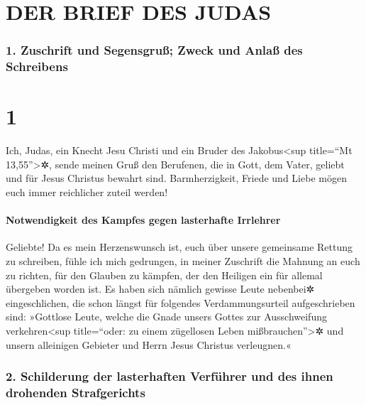 \hypertarget{der-brief-des-judas}{%
\section{DER BRIEF DES JUDAS}\label{der-brief-des-judas}}

\hypertarget{zuschrift-und-segensgruuxdf-zweck-und-anlauxdf-des-schreibens}{%
\subsubsection{1. Zuschrift und Segensgruß; Zweck und Anlaß des
Schreibens}\label{zuschrift-und-segensgruuxdf-zweck-und-anlauxdf-des-schreibens}}

\hypertarget{section}{%
\section{1}\label{section}}

 Ich, Judas, ein Knecht Jesu Christi und ein Bruder des
Jakobus\textless sup title=``Mt 13,55''\textgreater✲, sende meinen Gruß
den Berufenen, die in Gott, dem Vater, geliebt und für Jesus Christus
bewahrt sind.  Barmherzigkeit, Friede und Liebe mögen euch
immer reichlicher zuteil werden!

\hypertarget{notwendigkeit-des-kampfes-gegen-lasterhafte-irrlehrer}{%
\paragraph{Notwendigkeit des Kampfes gegen lasterhafte
Irrlehrer}\label{notwendigkeit-des-kampfes-gegen-lasterhafte-irrlehrer}}

 Geliebte! Da es mein Herzenswunsch ist, euch über unsere
gemeinsame Rettung zu schreiben, fühle ich mich gedrungen, in meiner
Zuschrift die Mahnung an euch zu richten, für den Glauben zu kämpfen,
der den Heiligen ein für allemal übergeben worden ist.  Es
haben sich nämlich gewisse Leute nebenbei✲ eingeschlichen, die schon
längst für folgendes Verdammungsurteil aufgeschrieben sind: »Gottlose
Leute, welche die Gnade unsers Gottes zur Ausschweifung
verkehren\textless sup title=``oder: zu einem zügellosen Leben
mißbrauchen''\textgreater✲ und unsern alleinigen Gebieter und Herrn
Jesus Christus verleugnen.«

\hypertarget{schilderung-der-lasterhaften-verfuxfchrer-und-des-ihnen-drohenden-strafgerichts}{%
\subsubsection{2. Schilderung der lasterhaften Verführer und des ihnen
drohenden
Strafgerichts}\label{schilderung-der-lasterhaften-verfuxfchrer-und-des-ihnen-drohenden-strafgerichts}}

